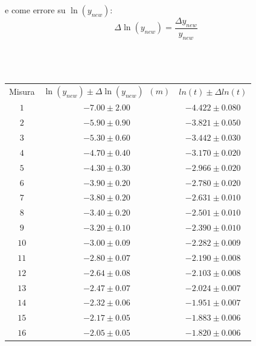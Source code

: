 \documentclass[12pt, a4paper]{article}
\begin{document}
e come errore su $\ln({y_{new}})$: 
\begin{equation*}
    \Delta\ln{(y_{new})}=\frac{\Delta y_{new}}{y_{new}}\ 
\end{equation*}\\
\\
\\
\begin{longtable}{|c|c|c|}
    \hline
    \multirow{2}{*}{\small Misura} 
    &\multirow{2}{*}{\small$\ln({y_{new}}) \pm\Delta\ln{(y_{new})}$\ $(m)$} 
    &\multirow{2}{*}{\small$ln(t)\pm\Delta ln(t)$} 
    \\
    &&
    \\
    \hline
    \footnotesize$1$ & \footnotesize$-7.00\pm2.00$  &\footnotesize$-4.422\pm 0.080$\\
    \footnotesize$2$ & \footnotesize$-5.90\pm0.90$&\footnotesize$-3.821\pm 0.050$  \\
    \footnotesize$3$ & \footnotesize$-5.30\pm0.60$&\footnotesize$-3.442\pm 0.030$  \\
    \footnotesize$4$ & \footnotesize$-4.70\pm0.40$ &\footnotesize$-3.170\pm 0.020$ \\
    \footnotesize$5$ & \footnotesize$-4.30\pm0.30$&\footnotesize$-2.966\pm 0.020$  \\
    \footnotesize$6$ & \footnotesize$-3.90\pm0.20$&\footnotesize$-2.780\pm 0.020$  \\
    \footnotesize$7$ & \footnotesize$-3.80\pm0.20$ &\footnotesize$-2.631\pm 0.010$ \\
    \footnotesize$8$ & \footnotesize$-3.40\pm0.20$&\footnotesize$-2.501\pm 0.010$   \\
    \footnotesize$9$ & \footnotesize$-3.20\pm0.10$&\footnotesize$-2.390\pm 0.010$   \\
    \footnotesize$10$ & \footnotesize$-3.00\pm0.09$&\footnotesize$-2.282\pm 0.009$ \\
    \footnotesize$11$ & \footnotesize$-2.80\pm0.07$&\footnotesize$-2.190\pm 0.008$ \\
    \footnotesize$12$ & \footnotesize$-2.64\pm0.08$&\footnotesize$-2.103\pm 0.008$ \\
    \footnotesize$13$ & \footnotesize$-2.47\pm0.07$&\footnotesize$-2.024\pm 0.007$ \\
    \footnotesize$14$ & \footnotesize$-2.32\pm0.06$&\footnotesize$-1.951\pm 0.007$ \\
    \footnotesize$15$ & \footnotesize$-2.17\pm0.05$&\footnotesize$-1.883\pm 0.006$ \\
    \footnotesize$16$ & \footnotesize$-2.05\pm0.05$&\footnotesize$-1.820\pm 0.006$ \\

\end{longtable}
\end{document}

